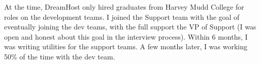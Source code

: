 At the time, DreamHost only hired graduates from Harvey Mudd College for roles on the development teams. I joined the
Support team with the goal of eventually joining the dev teams, with the full support the VP of Support (I was open and
honest about this goal in the interview process). Within 6 months, I was writing utilities for the support teams. A few
months later, I was working 50\% of the time with the dev team.
